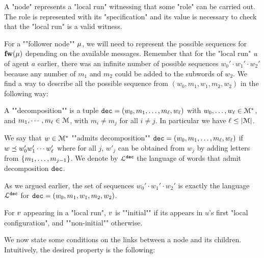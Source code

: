 A "node" represents a "local run" witnessing that some "role" can be carried out. The role is represented with its "specification" and its value is necessary to check that the "local run" is a valid witness.

For a ""follower node"" $\mu$, we will need to represent the possible sequences for $\mathbf{fw}(\mu)$ depending on the available messages. Remember that for the "local run" $u$ of agent $a$ earlier, there was an infinite number of possible sequences $w_0' \cdot w_1' \cdot w_2'$ because any number of $m_1$ and $m_2$ could be added to the subwords of $w_2$. We find a way to describe all the possible sequence from $(w_0, m_1, w_1, m_2, w_2)$ in the following way:

A ""decomposition"" is a tuple $\mathtt{dec} = (w_0, m_1, \ldots, m_\ell, w_\ell)$ with $w_0, \ldots, w_\ell \in \mathcal{M}^*$, and $m_1, \cdots, m_\ell \in \mathcal{M}$, with $m_i \neq m_j$ for all $i\neq j$. In particular we have $\ell \leq |\mathcal{M}|$. 

We say that $w \in \mathcal{M}^*$ ""admits decomposition"" $\mathtt{dec} = (w_0, m_1, \ldots, m_\ell, w_\ell)$ if $w \preceq w'_0 w'_1 \cdots w'_\ell$ where for all $j$, $w'_j$ can be obtained from $w_j$ by adding letters from $\{m_1, \ldots, m_{j-1}\}$.
We denote by $\mathcal{L}^{\mathtt{\mathtt{dec}}}$ the language of words that admit decomposition $\mathtt{dec}$. 

As we argued earlier, the set of sequences $w_0' \cdot w_1' \cdot w_2'$ is exactly the language $\mathcal{L}^{\mathtt{\mathtt{dec}}}$ for $\mathtt{dec} = (w_0, m_1, w_1, m_2, w_2)$.

For $v$ appearing in a "local run", $v$ is ""initial"" if its appears in $u$'s first "local configuration", and ""non-initial"" otherwise. 


We now state some conditions on the links between a node and its children. Intuitively, the desired property is the following: 

